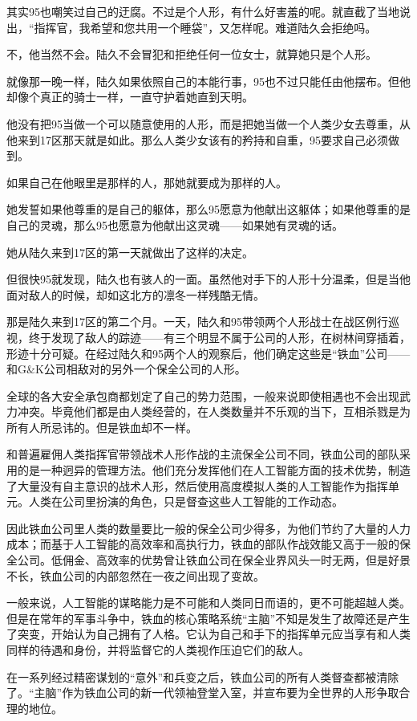 其实95也嘲笑过自己的迂腐。不过是个人形，有什么好害羞的呢。就直截了当地说出，“指挥官，我希望和您共用一个睡袋”，又怎样呢。难道陆久会拒绝吗。

不，他当然不会。陆久不会冒犯和拒绝任何一位女士，就算她只是个人形。

就像那一晚一样，陆久如果依照自己的本能行事，95也不过只能任由他摆布。但他却像个真正的骑士一样，一直守护着她直到天明。

他没有把95当做一个可以随意使用的人形，而是把她当做一个人类少女去尊重，从他来到17区那天就是如此。那么人类少女该有的矜持和自重，95要求自己必须做到。

如果自己在他眼里是那样的人，那她就要成为那样的人。

她发誓如果他尊重的是自己的躯体，那么95愿意为他献出这躯体；如果他尊重的是自己的灵魂，那么95也愿意为他献出这灵魂——如果她有灵魂的话。

她从陆久来到17区的第一天就做出了这样的决定。

但很快95就发现，陆久也有骇人的一面。虽然他对手下的人形十分温柔，但是当他面对敌人的时候，却如这北方的凛冬一样残酷无情。

那是陆久来到17区的第二个月。一天，陆久和95带领两个人形战士在战区例行巡视，终于发现了敌人的踪迹——有三个明显不属于公司的人形，在树林间穿插着，形迹十分可疑。在经过陆久和95两个人的观察后，他们确定这些是“铁血”公司——和G\&K公司相敌对的另外一个保全公司的人形。

全球的各大安全承包商都划定了自己的势力范围，一般来说即使相遇也不会出现武力冲突。毕竟他们都是由人类经营的，在人类数量并不乐观的当下，互相杀戮是为所有人所忌讳的。但是铁血却不一样。

和普遍雇佣人类指挥官带领战术人形作战的主流保全公司不同，铁血公司的部队采用的是一种迥异的管理方法。他们充分发挥他们在人工智能方面的技术优势，制造了大量没有自主意识的战术人形，然后使用高度模拟人类的人工智能作为指挥单元。人类在公司里扮演的角色，只是督查这些人工智能的工作动态。

因此铁血公司里人类的数量要比一般的保全公司少得多，为他们节约了大量的人力成本；而基于人工智能的高效率和高执行力，铁血的部队作战效能又高于一般的保全公司。低佣金、高效率的优势曾让铁血公司在保全业界风头一时无两，但是好景不长，铁血公司的内部忽然在一夜之间出现了变故。

一般来说，人工智能的谋略能力是不可能和人类同日而语的，更不可能超越人类。但是在常年的军事斗争中，铁血的核心策略系统“主脑”不知是发生了故障还是产生了突变，开始认为自己拥有了人格。它认为自己和手下的指挥单元应当享有和人类同样的待遇和身份，并将监督它的人类视作压迫它们的敌人。

在一系列经过精密谋划的“意外”和兵变之后，铁血公司的所有人类督查都被清除了。“主脑”作为铁血公司的新一代领袖登堂入室，并宣布要为全世界的人形争取合理的地位。

